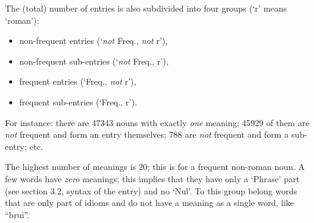 The (total) number of entries is also subdivided into four groups (`r' means
`roman'): 
\begin{itemize}
  \item non-frequent entries (`{\em not} Freq., {\em not} r'), 
  \item non-frequent sub-entries (`{\em not} Freq., r'),
  \item frequent entries (`Freq., {\em not} r'),
  \item frequent sub-entries (`Freq., r').
\end{itemize}
For instance: there are 47343 nouns
with exactly {\em one} meaning; 45929 of them are {\em not} frequent and form
an entry themselves; 788 are {\em not} frequent and form a sub-entry; etc.

The highest number of meanings is 20; this is for a frequent non-roman noun.
A few words have {\em zero} meanings; this implies that they have only
a `Phrase' part (see section 3.2, syntax of the entry) and no `Nul'. To this 
group belong words that are only part of idioms and do not have a meaning 
as a single word, like ``brui''.


